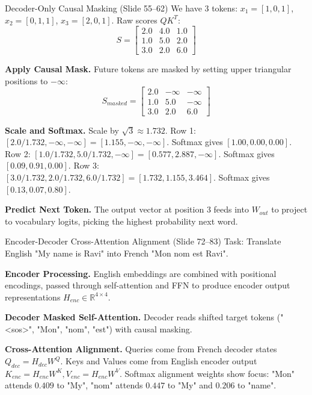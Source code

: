 \documentclass[a4paper,11pt]{article}
\begin{document}
\begin{worked}{Decoder-Only Causal Masking (Slide 55--62)}
We have 3 tokens: $x_1 = [1, 0, 1]$, $x_2 = [0, 1, 1]$, $x_3 = [2, 0, 1]$.
Raw scores $Q K^T$:
$$ S = \begin{bmatrix} 2.0 & 4.0 & 1.0 \\ 1.0 & 5.0 & 2.0 \\ 3.0 & 2.0 & 6.0 \end{bmatrix} $$

\begin{steps}
  \item \textbf{Apply Causal Mask.}
        Future tokens are masked by setting upper triangular positions to $-\infty$:
        $$ S_{masked} = \begin{bmatrix} 2.0 & -\infty & -\infty \\ 1.0 & 5.0 & -\infty \\ 3.0 & 2.0 & 6.0 \end{bmatrix} $$
  \item \textbf{Scale and Softmax.}
        Scale by $\sqrt{3} \approx 1.732$.
        Row 1: $[2.0/1.732, -\infty, -\infty] = [1.155, -\infty, -\infty]$. Softmax gives $[1.00, 0.00, 0.00]$.
        Row 2: $[1.0/1.732, 5.0/1.732, -\infty] = [0.577, 2.887, -\infty]$. Softmax gives $[0.09, 0.91, 0.00]$.
        Row 3: $[3.0/1.732, 2.0/1.732, 6.0/1.732] = [1.732, 1.155, 3.464]$. Softmax gives $[0.13, 0.07, 0.80]$.
  \item \textbf{Predict Next Token.}
        The output vector at position 3 feeds into $W_{out}$ to project to vocabulary logits, picking the highest probability next word.
\end{steps}
\end{worked}

\begin{worked}{Encoder-Decoder Cross-Attention Alignment (Slide 72--83)}
Task: Translate English "My name is Ravi" into French "Mon nom est Ravi".

\begin{steps}
  \item \textbf{Encoder Processing.}
        English embeddings are combined with positional encodings, passed through self-attention and FFN to produce encoder output representations $H_{enc} \in \mathbb{R}^{4 \times 4}$.
  \item \textbf{Decoder Masked Self-Attention.}
        Decoder reads shifted target tokens ("<sos>", "Mon", "nom", "est") with causal masking.
  \item \textbf{Cross-Attention Alignment.}
        Queries come from French decoder states $Q_{dec} = H_{dec} W^Q$.
        Keys and Values come from English encoder output $K_{enc} = H_{enc} W^K, V_{enc} = H_{enc} W^V$.
        Softmax alignment weights show focus: "Mon" attends $0.409$ to "My", "nom" attends $0.447$ to "My" and $0.206$ to "name".
\end{steps}
\end{worked}
\end{document}
